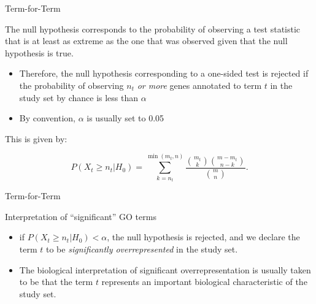 \documentclass{beamer}
\begin{document}
\begin{frame}{Term-for-Term}
 
The null hypothesis
corresponds to the probability of observing a test statistic that is at least as
extreme as the one that was observed given that the null hypothesis is true.
\begin{itemize}
 \item Therefore, the null
hypothesis corresponding to a one-sided
test is rejected if the probability of observing $n_t$ \textit{or more} genes
annotated to term $t$ in the study set by chance is less than
$\alpha$ 
\item By convention, $\alpha$ is usually set to 0.05
\end{itemize}

  This is given by:

\begin{equation}
  P(X_t\geq n_t|H_0) = \sum_{k=n_t}^{\min(m_t,n)} 
 \frac{\displaystyle{m_t \choose k}\displaystyle{{m - m_t} 
 \choose {n - k}}}{\displaystyle{m \choose n}}.
\label{eqn:fisher.tft}
\end{equation}

 
\end{frame}
\begin{frame}{Term-for-Term}

  Interpretation of ``significant'' GO terms

\begin{itemize}
 \item if $P(X_t\geq n_t|H_0) < \alpha$, the null hypothesis is
rejected, and we declare the term $t$ to be \textit{significantly
overrepresented} in the study set.
\item The biological interpretation of
significant overrepresentation is usually taken to be that the term
$t$ represents an important biological characteristic of the study
set.
\end{itemize}

 
 
\end{frame}
\end{document}
